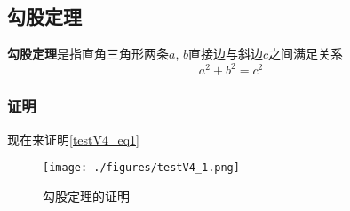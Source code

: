 
\subsection{勾股定理}
\textbf{勾股定理}是指直角三角形两条$a$, $b$直接边与斜边$c$之间满足关系
\begin{equation}\label{testV4_eq1}
a^2 + b^2 = c^2
\end{equation}

\subsubsection{证明}
现在来证明\autoref{testV4_eq1}

\begin{figure}[ht]
\centering
\texttt{[image: ./figures/testV4\_1.png]}
\caption{勾股定理的证明} \label{testV4_fig1}
\end{figure}